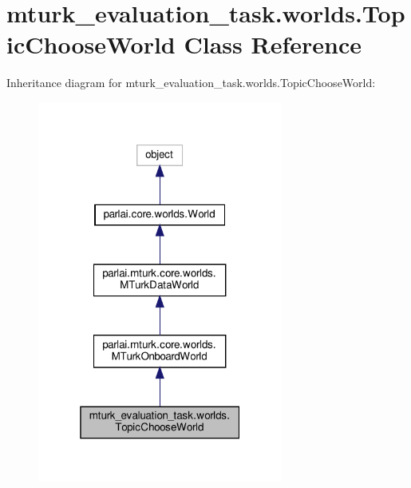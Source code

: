 \hypertarget{classmturk__evaluation__task_1_1worlds_1_1TopicChooseWorld}{}\section{mturk\+\_\+evaluation\+\_\+task.\+worlds.\+Topic\+Choose\+World Class Reference}
\label{classmturk__evaluation__task_1_1worlds_1_1TopicChooseWorld}


Inheritance diagram for mturk\+\_\+evaluation\+\_\+task.\+worlds.\+Topic\+Choose\+World\+:
\nopagebreak
\begin{figure}[H]
\begin{center}
\leavevmode
\includegraphics[width=229pt]{classmturk__evaluation__task_1_1worlds_1_1TopicChooseWorld__inherit__graph}
\end{center}
\end{figure}


